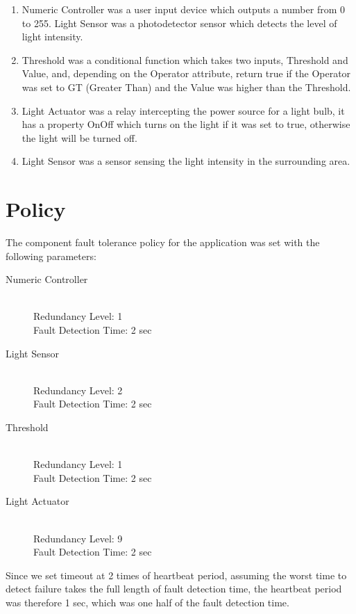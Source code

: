 \begin{enumerate}
\item Numeric Controller was a user input device which outputs
a number from 0 to 255. Light Sensor was a photodetector sensor which detects the
level of light intensity. 
\item Threshold was a conditional function which takes two
inputs, Threshold and Value, and, depending on the Operator attribute, return
true if the Operator was set to GT (Greater Than) and the Value was higher than
the Threshold. 
\item Light Actuator was a relay intercepting the power source for
a light bulb, it has a property OnOff which turns on the light if it was set to
true, otherwise the light will be turned off.
\item Light Sensor was a sensor sensing the light intensity in the surrounding
  area.
\end{enumerate}


\section{Policy}

The component fault tolerance policy for the application was set with the
following parameters:

\begin{description}
  \item[Numeric Controller] \hfill \\
    Redundancy Level: 1\\
    Fault Detection Time: 2 sec\\
  \item[Light Sensor] \hfill \\
    Redundancy Level: 2\\
    Fault Detection Time: 2 sec\\
  \item[Threshold] \hfill \\
    Redundancy Level: 1\\
    Fault Detection Time: 2 sec\\
  \item[Light Actuator] \hfill \\
    Redundancy Level: 9\\
    Fault Detection Time: 2 sec\\
\end{description}

Since we set timeout at 2 times of heartbeat period, assuming the worst time to detect
failure takes the full length of fault detection time, the heartbeat
period was therefore 1 sec, which was one half of the fault detection time.

